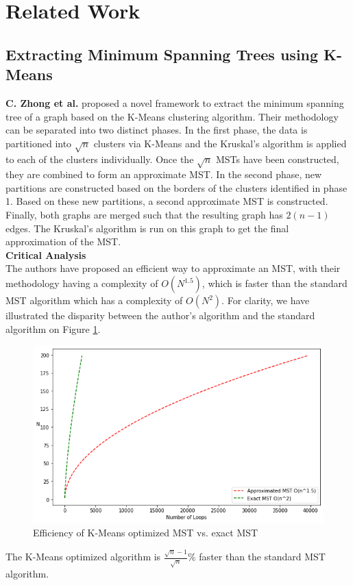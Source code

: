 \documentclass[paper=a4,fontsize=11pt]{report}	%
\begin{document}
\section{Related Work}

\subsection{Extracting Minimum Spanning Trees using K-Means}
\textbf{C. Zhong et al.} \cite{kmeans_mst} proposed a novel framework to extract the minimum spanning tree of a graph based on the K-Means clustering algorithm. Their methodology can be separated into two distinct phases. In the first phase,  the data is partitioned into $\sqrt{n}$ clusters via K-Means and the Kruskal's algorithm is applied to each of the clusters individually.  Once the $\sqrt{n}$ MSTs have been constructed, they are combined to form an approximate MST. In the second phase,  new partitions are constructed based on the borders of the clusters identified in phase 1.  Based on these new partitions, a second approximate MST is constructed.  Finally, both graphs are merged such that the resulting graph has $2(n-1)$ edges. The Kruskal's algorithm is run on this graph to get the final approximation of the MST.
\\\textbf{Critical Analysis}\\
The authors have proposed an efficient way to approximate an MST, with their methodology having a complexity of $O(N^{1.5})$, which is faster than the standard MST algorithm which has a complexity of $O(N^2)$. 
For clarity, we have illustrated the disparity between the author's algorithm and the standard algorithm on Figure \ref{fig:speed-compare}.
\begin{figure}[H]
\centering
\includegraphics[scale=0.6]{speed-compare} 
\caption{Efficiency of K-Means optimized MST vs.  exact MST}\label{fig:speed-compare}
\end{figure}
\noindent  The K-Means optimized algorithm is $\frac{\sqrt{n}-1}{\sqrt{n}}\%$  faster than the standard MST algorithm.
\end{document}
